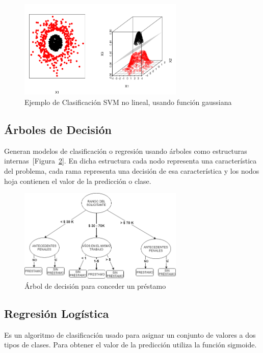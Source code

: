 \begin{figure}[H]
    \centering
    \includegraphics[width=0.7\textwidth, keepaspectratio]{imaxes/svm_exmaple_clf.png}
    \caption[Ejemplo de Clasificación SVM no lineal, usando función gaussiana]{Ejemplo de Clasificación SVM no lineal, usando función gaussiana \cite{joaquin}}
     \label{fig:kernel_clf}
\end{figure}

\subsection{Árboles de Decisión}
\label{sec:decision_tree}
Generan modelos de clasificación o regresión usando árboles como estructuras internas~[Figura~\ref{fig:decisiontree}]. En dicha estructura cada nodo representa una característica del problema, cada rama representa una decisión de esa característica y los nodos hoja contienen el valor de la predicción o clase.

\begin{figure}[h]
    \centering
    \includegraphics[width=0.7\textwidth, keepaspectratio]{imaxes/decision_tree.png}
    \caption{Árbol de decisión para conceder un préstamo}
    \label{fig:decisiontree}
\end{figure}

\subsection{Regresión Logística}
\label{sec:logistic_regresion}
Es un algoritmo de clasificación usado para asignar un conjunto de valores a dos tipos de clases. 
Para obtener el valor de la predicción utiliza la función sigmoide.

